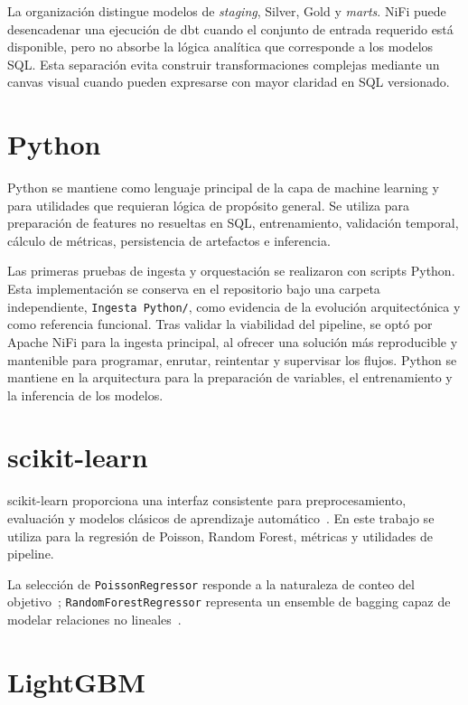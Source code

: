 La organización distingue modelos de \textit{staging}, Silver, Gold y \textit{marts}. NiFi puede desencadenar una ejecución de dbt cuando el conjunto de entrada requerido está disponible, pero no absorbe la lógica analítica que corresponde a los modelos SQL\@. Esta separación evita construir transformaciones complejas mediante un canvas visual cuando pueden expresarse con mayor claridad en SQL versionado.

\section{Python}

Python se mantiene como lenguaje principal de la capa de machine learning y para utilidades que requieran lógica de propósito general. Se utiliza para preparación de features no resueltas en SQL, entrenamiento, validación temporal, cálculo de métricas, persistencia de artefactos e inferencia.

Las primeras pruebas de ingesta y orquestación se realizaron con scripts Python. Esta implementación se conserva en el repositorio bajo una carpeta independiente, \texttt{Ingesta Python/}, como evidencia de la evolución arquitectónica y como referencia funcional. Tras validar la viabilidad del pipeline, se optó por Apache NiFi para la ingesta principal, al ofrecer una solución más reproducible y mantenible para programar, enrutar, reintentar y supervisar los flujos. Python se mantiene en la arquitectura para la preparación de variables, el entrenamiento y la inferencia de los modelos.

\section{scikit-learn}

scikit-learn proporciona una interfaz consistente para preprocesamiento, evaluación y modelos clásicos de aprendizaje automático~\cite{pedregosa2011}. En este trabajo se utiliza para la regresión de Poisson, Random Forest, métricas y utilidades de pipeline.

La selección de \texttt{PoissonRegressor} responde a la naturaleza de conteo del objetivo~\cite{sklearn_poisson}; \texttt{RandomForestRegressor} representa un ensemble de bagging capaz de modelar relaciones no lineales~\cite{sklearn_rf}.

\section{LightGBM}

